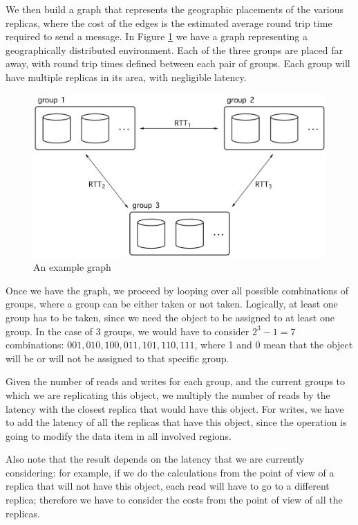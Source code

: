 We then build a graph that represents the geographic placements of the various replicas, where the cost of the edges is the estimated average round trip time required to send a message. In Figure \ref{fig:graph} we have a graph representing a geographically distributed environment. Each of the three groups are placed far away, with round trip times defined between each pair of groups. Each group will have multiple replicas in its area, with negligible latency.

\begin{figure}[!htb]
  \centering
  \includegraphics[width=\textwidth,height=\textheight,keepaspectratio]{img/graph.png}
  \caption{An example graph}
  \label{fig:graph}
\end{figure}

Once we have the graph, we proceed by looping over all possible combinations of groups, where a group can be either taken or not taken. Logically, at least one group has to be taken, since we need the object to be assigned to at least one group. In the case of 3 groups, we would have to consider $2^3 -1 = 7$ combinations: $001, 010, 100, 011, 101, 110, 111$, where 1 and 0 mean that the object will be or will not be assigned to that specific group.

Given the number of reads and writes for each group, and the current groups to which we are replicating this object, we multiply the number of reads by the latency with the closest replica that would have this object. For writes, we have to add the latency of all the replicas that have this object, since the operation is going to modify the data item in all involved regions.

Also note that the result depends on the latency that we are currently considering: for example, if we do the calculations from the point of view of a replica that will not have this object, each read will have to go to a different replica; therefore we have to consider the costs from the point of view of all the replicas.

